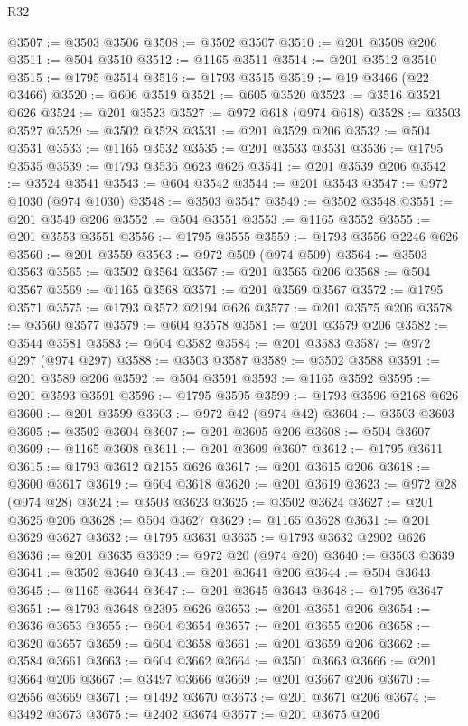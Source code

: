 \begin{lexlean}{R32}
\begin{coremodule}
@3507 := @3503 @3506
@3508 := @3502 @3507
@3510 := @201 @3508 @206
@3511 := @504 @3510
@3512 := @1165 @3511
@3514 := @201 @3512 @3510
@3515 := @1795 @3514
@3516 := @1793 @3515
@3519 := @19 @3466 (@22 @3466)
@3520 := @606 @3519
@3521 := @605 @3520
@3523 := @3516 @3521 @626
@3524 := @201 @3523
@3527 := @972 @618 (@974 @618)
@3528 := @3503 @3527
@3529 := @3502 @3528
@3531 := @201 @3529 @206
@3532 := @504 @3531
@3533 := @1165 @3532
@3535 := @201 @3533 @3531
@3536 := @1795 @3535
@3539 := @1793 @3536 @623 @626
@3541 := @201 @3539 @206
@3542 := @3524 @3541
@3543 := @604 @3542
@3544 := @201 @3543
@3547 := @972 @1030 (@974 @1030)
@3548 := @3503 @3547
@3549 := @3502 @3548
@3551 := @201 @3549 @206
@3552 := @504 @3551
@3553 := @1165 @3552
@3555 := @201 @3553 @3551
@3556 := @1795 @3555
@3559 := @1793 @3556 @2246 @626
@3560 := @201 @3559
@3563 := @972 @509 (@974 @509)
@3564 := @3503 @3563
@3565 := @3502 @3564
@3567 := @201 @3565 @206
@3568 := @504 @3567
@3569 := @1165 @3568
@3571 := @201 @3569 @3567
@3572 := @1795 @3571
@3575 := @1793 @3572 @2194 @626
@3577 := @201 @3575 @206
@3578 := @3560 @3577
@3579 := @604 @3578
@3581 := @201 @3579 @206
@3582 := @3544 @3581
@3583 := @604 @3582
@3584 := @201 @3583
@3587 := @972 @297 (@974 @297)
@3588 := @3503 @3587
@3589 := @3502 @3588
@3591 := @201 @3589 @206
@3592 := @504 @3591
@3593 := @1165 @3592
@3595 := @201 @3593 @3591
@3596 := @1795 @3595
@3599 := @1793 @3596 @2168 @626
@3600 := @201 @3599
@3603 := @972 @42 (@974 @42)
@3604 := @3503 @3603
@3605 := @3502 @3604
@3607 := @201 @3605 @206
@3608 := @504 @3607
@3609 := @1165 @3608
@3611 := @201 @3609 @3607
@3612 := @1795 @3611
@3615 := @1793 @3612 @2155 @626
@3617 := @201 @3615 @206
@3618 := @3600 @3617
@3619 := @604 @3618
@3620 := @201 @3619
@3623 := @972 @28 (@974 @28)
@3624 := @3503 @3623
@3625 := @3502 @3624
@3627 := @201 @3625 @206
@3628 := @504 @3627
@3629 := @1165 @3628
@3631 := @201 @3629 @3627
@3632 := @1795 @3631
@3635 := @1793 @3632 @2902 @626
@3636 := @201 @3635
@3639 := @972 @20 (@974 @20)
@3640 := @3503 @3639
@3641 := @3502 @3640
@3643 := @201 @3641 @206
@3644 := @504 @3643
@3645 := @1165 @3644
@3647 := @201 @3645 @3643
@3648 := @1795 @3647
@3651 := @1793 @3648 @2395 @626
@3653 := @201 @3651 @206
@3654 := @3636 @3653
@3655 := @604 @3654
@3657 := @201 @3655 @206
@3658 := @3620 @3657
@3659 := @604 @3658
@3661 := @201 @3659 @206
@3662 := @3584 @3661
@3663 := @604 @3662
@3664 := @3501 @3663
@3666 := @201 @3664 @206
@3667 := @3497 @3666
@3669 := @201 @3667 @206
@3670 := @2656 @3669
@3671 := @1492 @3670
@3673 := @201 @3671 @206
@3674 := @3492 @3673
@3675 := @2402 @3674
@3677 := @201 @3675 @206

\end{coremodule}
\end{lexlean}
